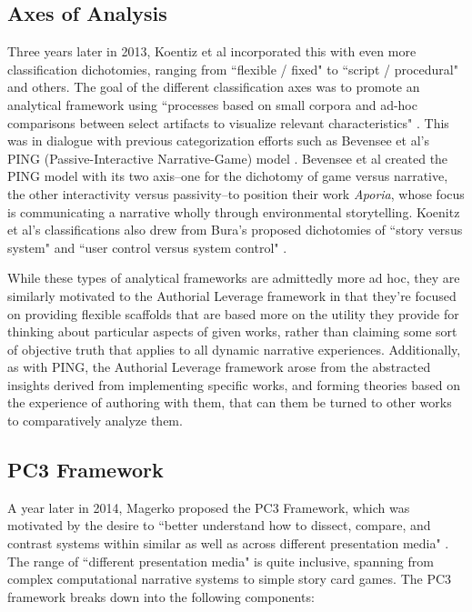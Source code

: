 \subsection{Axes of Analysis}

Three years later in 2013, Koentiz et al incorporated this with even more classification dichotomies, ranging from ``flexible / fixed" to ``script / procedural" and others. The goal of the different classification axes was to promote an analytical framework using ``processes based on small corpora and ad-hoc comparisons between select artifacts to visualize relevant characteristics" \cite{koenitz_idn}. This was in dialogue with previous categorization efforts such as Bevensee et al's PING (Passive-Interactive Narrative-Game) model \cite{aporia}. Bevensee et al created the PING model with its two axis--one for the dichotomy of game versus narrative, the other interactivity versus passivity--to position their work \textit{Aporia}, whose focus is communicating a narrative wholly through environmental storytelling. Koenitz et al's classifications also drew from Bura's proposed dichotomies of ``story versus system" and ``user control versus system control" \cite{koenitz_idn}.

While these types of analytical frameworks are admittedly more ad hoc, they are similarly motivated to the Authorial Leverage framework in that they're focused on providing flexible scaffolds that are based more on the utility they provide for thinking about particular aspects of given works, rather than claiming some sort of objective truth that applies to all dynamic narrative experiences. Additionally, as with PING, the Authorial Leverage framework arose from the abstracted insights derived from implementing specific works, and forming theories based on the experience of authoring with them, that can them be turned to other works to comparatively analyze them.

\subsection{PC3 Framework}

A year later in 2014, Magerko proposed the PC3 Framework, which was motivated by the desire to ``better understand how to dissect, compare, and contrast systems within similar as well as across different presentation media" \cite{magerko_PC3}. The range of ``different presentation media" is quite inclusive, spanning from complex computational narrative systems to simple story card games. The PC3 framework breaks down into the following components:


